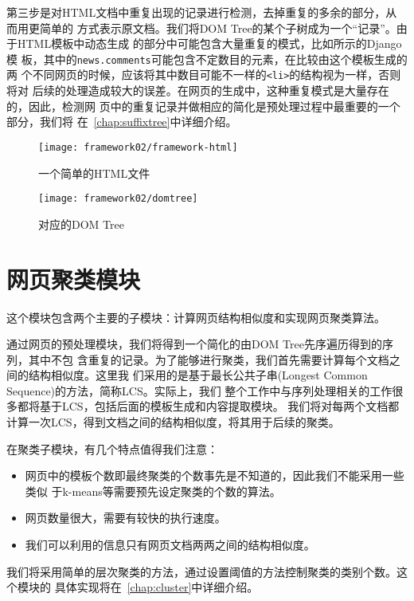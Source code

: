 第三步是对HTML文档中重复出现的记录进行检测，去掉重复的多余的部分，从而用更简单的
方式表示原文档。我们将DOM Tree的某个子树成为一个“记录”。由于HTML模板中动态生成
的部分中可能包含大量重复的模式，比如所示的Django模
板，其中的\texttt{news.comments}可能包含不定数目的元素，在比较由这个模板生成的两
个不同网页的时候，应该将其中数目可能不一样的\texttt{<li>}的结构视为一样，否则将对
后续的处理造成较大的误差。在网页的生成中，这种重复模式是大量存在的，因此，检测网
页中的重复记录并做相应的简化是预处理过程中最重要的一个部分，我们将
在~\ref{chap:suffixtree}中详细介绍。
\begin{figure}
  \begin{minipage}[t]{0.5\linewidth}
  \centering
  \texttt{[image: framework02/framework-html]}
  \caption{一个简单的HTML文件}
  \label{framework:fig:html}
\end{minipage}
\begin{minipage}[t]{0.5\linewidth}
  \centering
  \texttt{[image: framework02/domtree]}
  \caption{对应的DOM Tree}
  \label{framework:fig:domtree}
\end{minipage}
\end{figure}
\section{网页聚类模块}
\label{sec:clusterintro}
这个模块包含两个主要的子模块：计算网页结构相似度和实现网页聚类算法。

通过网页的预处理模块，我们将得到一个简化的由DOM Tree先序遍历得到的序列，其中不包
含重复的记录。为了能够进行聚类，我们首先需要计算每个文档之间的结构相似度。这里我
们采用的是基于最长公共子串(Longest Common Sequence)的方法，简称LCS。实际上，我们
整个工作中与序列处理相关的工作很多都将基于LCS，包括后面的模板生成和内容提取模块。
我们将对每两个文档都计算一次LCS，得到文档之间的结构相似度，将其用于后续的聚类。

在聚类子模块，有几个特点值得我们注意：
\begin{itemize}
\item 网页中的模板个数即最终聚类的个数事先是不知道的，因此我们不能采用一些类似
  于k-means等需要预先设定聚类的个数的算法。
\item 网页数量很大，需要有较快的执行速度。
\item 我们可以利用的信息只有网页文档两两之间的结构相似度。
\end{itemize}

我们将采用简单的层次聚类的方法，通过设置阈值的方法控制聚类的类别个数。这个模块的
具体实现将在~\ref{chap:cluster}中详细介绍。
